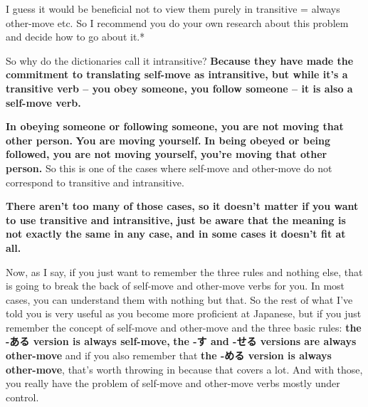 I guess it would be beneficial not to view them purely in transitive = always other-move etc.\crlf
So I recommend you do your own research about this problem and decide how to go about it.*

So why do the dictionaries call it intransitive? {\bf Because they have made the commitment to translating self-move as intransitive, but while it's a transitive verb -- you obey someone, you follow someone -- it is also a self-move verb.}

\thinrule

{\bf In obeying someone or following someone, you are not moving that other person.} {\bf You are moving yourself.} {\bf In being obeyed or being followed, you are not moving yourself, you're moving that other person.} So this is one of the cases where self-move and other-move do not correspond to transitive and intransitive.

\thinrule

{\bf There aren't too many of those cases, so it doesn't matter if you want to use transitive and intransitive, just be aware that the meaning is not exactly the same in any case, and in some cases it doesn't fit at all.}

Now, as I say, if you just want to remember the three rules and nothing else, that is going to break the back of self-move and other-move verbs for you. In most cases, you can understand them with nothing but that. So the rest of what I've told you is very useful as you become more proficient at Japanese, but if you just remember the concept of self-move and other-move and the three basic rules: {\bf the -ある version is always self-move,} {\bf the -す and -せる versions are always other-move} and if you also remember that {\bf the -める version is always other-move}, that's worth throwing in because that covers a lot. And with those, you really have the problem of self-move and other-move verbs mostly under control.

\stopsectionlevel

\stopsectionlevel
